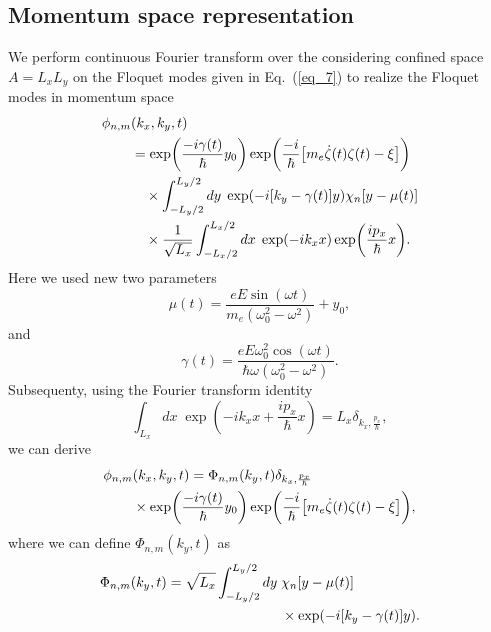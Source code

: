 \subsection{Momentum space representation}

We perform continuous Fourier transform over the considering confined space $A=L_xL_y$ on the Floquet modes given in Eq.~(\ref{eq_7}) to realize the Floquet modes in momentum space
\begin{equation} \label{eq_b8}
  \begin{aligned}
    \phi_{n,m}&(k_x,k_y,t) \\
    & =
    \exp(
     \frac{-i\gamma(t)}{\hbar}
     y_0)
    \exp(\frac{-i}{\hbar}
    \qty[
    m_e \dot{\zeta}(t) \zeta(t) - \xi
    ])\\
    & \quad\times
    \int_{-L_y/2}^{L_y/2} dy\; \exp(-i\qty[k_y - \gamma(t)]y)
    \chi_{n}\qty[y - \mu(t)] \\
     & \quad\times
     \frac{1}{\sqrt{L_x}}
     \int_{-L_x/2}^{L_x/2} dx\;
     \exp(-ik_x x)
     \exp( \frac{i p_x }{\hbar}x ).
  \end{aligned}
\end{equation}
Here we used new two parameters
\begin{equation} \label{eq_b9a}
  \mu(t) = \frac{eE\sin(\omega t)}{m_e(\omega_0^2 - \omega^2)} + y_0,
\end{equation}
and
\begin{equation} \label{eq_b9b}
  \gamma(t) =
  \frac{eE\omega_0^2\cos(\omega t)}{\hbar\omega(\omega_0^2 - \omega^2)}.
\end{equation}
Subsequenty, using the Fourier transform identity \cite{bruus04}
\begin{equation} \label{eq_b10}
  \int_{L_x} dx\;
  \exp( -ik_x x + \frac{i p_x }{\hbar}x ) =
  L_x \delta_{k_x,\frac{p_x}{\hbar}},
\end{equation}
we can derive
\begin{equation} \label{eq_b11}
  \begin{aligned}
    \phi_{n,m}&(k_x,k_y,t)  =
    \Phi_{n,m}(k_y,t)
    \delta_{k_x,\frac{p_x}{\hbar}}\\
    & \times
    \exp(
     \frac{-i\gamma(t)}{\hbar}
     y_0)
    \exp(\frac{-i}{\hbar}
    \qty[
    m_e \dot{\zeta}(t) \zeta(t) - \xi
    ]),
  \end{aligned}
\end{equation}
where we can define $\Phi_{n,m}(k_y,t)$ as
\begin{equation} \label{eq_b12}
  \begin{aligned}
    \Phi_{n,m}(k_y,t) =
    \sqrt{L_x}
    \int_{-L_y/2}^{L_y/2} dy\; &
    \chi_{n}\qty[y - \mu(t)] \\
    & \times
    \exp(
      -i\qty[k_y - \gamma(t)]
      y).
  \end{aligned}
\end{equation}
